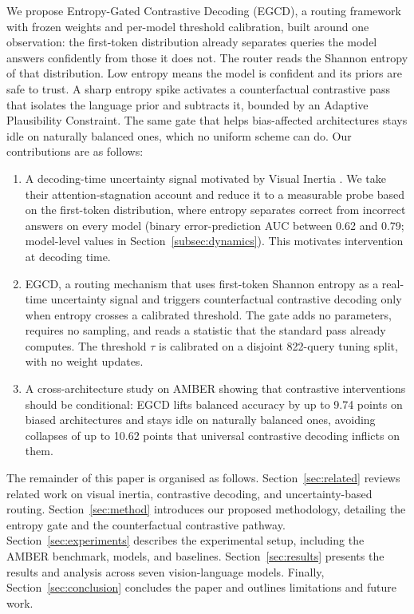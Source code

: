 \documentclass{ieeeaccess}
\begin{document}
We propose Entropy-Gated Contrastive Decoding (EGCD), a routing framework with frozen weights and per-model threshold calibration, built around one observation: the first-token distribution already separates queries the model answers confidently from those it does not. The router reads the Shannon entropy of that distribution. Low entropy means the model is confident and its priors are safe to trust. A sharp entropy spike activates a counterfactual contrastive pass that isolates the language prior and subtracts it, bounded by an Adaptive Plausibility Constraint. The same gate that helps bias-affected architectures stays idle on naturally balanced ones, which no uniform scheme can do. Our contributions are as follows:

\begin{enumerate}
\item A decoding-time uncertainty signal motivated by Visual Inertia \cite{gong2026attention}. We take their attention-stagnation account and reduce it to a measurable probe based on the first-token distribution, where entropy separates correct from incorrect answers on every model (binary error-prediction AUC between 0.62 and 0.79; model-level values in Section~\ref{subsec:dynamics}). This motivates intervention at decoding time.

\item EGCD, a routing mechanism that uses first-token Shannon entropy as a real-time uncertainty signal and triggers counterfactual contrastive decoding only when entropy crosses a calibrated threshold. The gate adds no parameters, requires no sampling, and reads a statistic that the standard pass already computes. The threshold $\tau$ is calibrated on a disjoint 822-query tuning split, with no weight updates.

\item A cross-architecture study on AMBER showing that contrastive interventions should be conditional: EGCD lifts balanced accuracy by up to 9.74 points on biased architectures and stays idle on naturally balanced ones, avoiding collapses of up to 10.62 points that universal contrastive decoding inflicts on them.
\end{enumerate}

The remainder of this paper is organised as follows. Section~\ref{sec:related} reviews related work on visual inertia, contrastive decoding, and uncertainty-based routing. Section~\ref{sec:method} introduces our proposed methodology, detailing the entropy gate and the counterfactual contrastive pathway. Section~\ref{sec:experiments} describes the experimental setup, including the AMBER benchmark, models, and baselines. Section~\ref{sec:results} presents the results and analysis across seven vision-language models. Finally, Section~\ref{sec:conclusion} concludes the paper and outlines limitations and future work.
\end{document}
